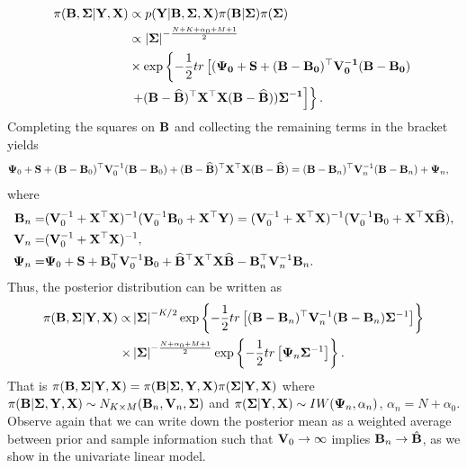 \begin{align*}
	\pi({\bf{B}},{\bm{\Sigma}}|{\bf{Y}},{\bf{X}})&\propto  p({\bf{Y}}|{\bf{B}},{\bm{\Sigma}},{\bf{X}}) \pi({\bf{B}}| {\bf \Sigma})\pi({\bm{\Sigma}})\\
	&\propto \left|{\bm{\Sigma}} \right|^{-\frac{N+K+\alpha_{0}+M+1}{2}}\\
	&\times\exp\left\lbrace -\frac{1}{2}tr\left[(\bf{\Psi}_{0}+{\bf{S}} +({\bf{B}}-{\bf{B}}_{0})^{\top}{\bf{V}}_{0}^{-1}({\bf{B}}-{\bf{B}}_{0})\right.\right.\\
	&\left.\left.   +({\bf{B}}-\widehat{\bf{B}})^{\top}{\bf{X}}^{\top}{\bf{X}}({\bf{B}}-\widehat{\bf{B}}))\bf{\Sigma}^{-1}\right]\right\rbrace .
\end{align*}
Completing the squares on ${\bf{B}}$ and collecting the remaining terms in the bracket yields
{\footnotesize{
\begin{align*}
	{\bf{\Psi}}_{0}+{\bf{S}} +({\bf{B}}-{\bf{B}}_{0})^{\top}{\bf{V}}_{0}^{-1}({\bf{B}}-{\bf{B}}_{0})+({\bf{B}}-\widehat{\bf{B}})^{\top}{\bf{X}}^{\top}{\bf{X}}({\bf{B}}-\widehat{\bf{B}})
	& = ({\bf{B}}-{\bf{B}}_n)^{\top}{\bf{V}}_n^{-1}({\bf{B}}-{\bf{B}}_n)+{\bf{\Psi}}_n,
\end{align*}
}}
where 
\begin{align*}
	{\bf{B}}_n = &({\bf{V}}_{0}^{-1}+{\bf{X}}^{\top}{\bf{X}})^{-1}({\bf{V}}_{0}^{-1}{\bf{B}}_{0}+{\bf{X}}^{\top}{\bf{Y}})=({\bf{V}}_{0}^{-1}+{\bf{X}}^{\top}{\bf{X}})^{-1}({\bf{V}}_{0}^{-1}{\bf{B}}_{0}+{\bf{X}}^{\top}{\bf{X}}\widehat{\bf{B}}),\\
	{\bf{V}}_n = &({\bf{V}}_{0}^{-1}+{\bf{X}}^{\top}{\bf{X}})^{-1},\\
	{\bf{\Psi}}_n= &{\bf{\Psi}}_{0}+{\bf{S}}+{\bf{B}}_{0}^{\top}{\bf{V}}_{0}^{-1}{\bf{B}}_{0}+\widehat{\bf{B}}^{\top}{\bf{X}}^{\top}{\bf{X}}\widehat{\bf{B}}-{\bf{B}}_n^{\top}{\bf{V}}_n^{-1}{\bf{B}}_n.
\end{align*}
Thus, the posterior distribution can be written as
\begin{align*}
	\pi({\bf{B}},{\bf \Sigma}| {\bf{Y}}, {\bf{X}})\propto &\left|{\bf \Sigma} \right|^{-K/2}\exp\left\lbrace -\frac{1}{2} tr\left[({\bf{B}}-{\bf{B}}_n)^{\top}{\bf{V}}_n^{-1}({\bf{B}}-{\bf{B}}_n)   {\bf \Sigma}^{-1}\right]\right\rbrace \\
	\times & \left|{\bf \Sigma} \right|^{-\frac{N+\alpha_{0}+M+1}{2}}\exp\left\lbrace -\frac{1}{2} tr \left[ {\bf{\Psi}}_n{\bf \Sigma}^{-1}\right] \right\rbrace .
\end{align*}
That is $\pi({\bf{B}},{\bf \Sigma}| {\bf{Y}}, {\bf{X}})=\pi ({\bf{B}}| {\bf \Sigma},{\bf{Y}},{\bf{X}})\pi({\bf \Sigma}| {\bf{Y}},{\bf{X}})$ where $\pi({\bf{B}}| {\bf \Sigma},{\bf{Y}}, {\bf{X}}) \sim N_{K\times M}({\bf{B}}_n,{\bf{V}}_n,{\bf \Sigma})$ and $\pi({\bf \Sigma}| {\bf{Y}},{\bf{X}}) \sim IW({\bf{\Psi}}_n,{\alpha}_n)$, $\alpha_n= N+\alpha_{0}$. Observe again that we can write down the posterior mean as a weighted average between prior and sample information such that ${\bf{V}}_0\rightarrow\infty$ implies ${\bf{B}}_n\rightarrow\hat{{\bf{B}}}$, as we show in the univariate linear model.

